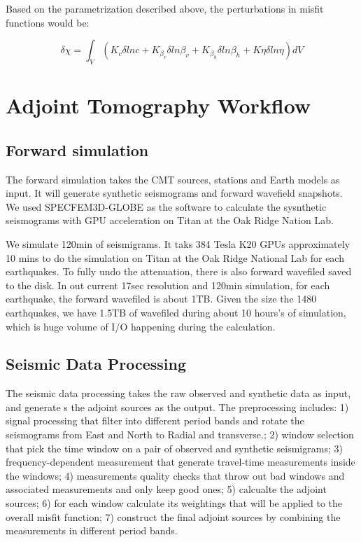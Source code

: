 \documentclass[extra,mreferee]{gji}
\begin{document}
Based on the parametrization described above, the perturbations in misfit functions would be:

\begin{equation*}
    \delta \chi = \int_V (K_c\delta lnc + K_{\beta_v}\delta ln\beta_v + K_{\beta_h}\delta ln\beta_h + K\eta \delta ln\eta) dV 
\end{equation*}

\section{Adjoint Tomography Workflow}

\subsection{Forward simulation}
The forward simulation takes the CMT sources, stations and Earth models as input. It will generate synthetic seismograms and forward wavefield snapshots. We used SPECFEM3D-GLOBE as the software to calculate the sysnthetic seismograms with GPU acceleration on Titan at the Oak Ridge Nation Lab.

We simulate 120min of seismigrams. It taks 384 Tesla K20 GPUs approximately 10 mins to do the simulation on Titan at the Oak Ridge National Lab for each earthquakes. To fully undo the attenuation, there is also forward wavefiled saved to the disk. In out current 17sec resolution and 120min simulation, for each earthquake, the forward wavefiled is about 1TB. Given the size the 1480 earthquakes, we have 1.5TB of wavefiled during about 10 hours's of simulation, which is huge volume of I/O happening during the calculation.

\subsection{Seismic Data Processing}

The seismic data processing takes the raw observed and synthetic data as input, and generate s the adjoint sources as the output. The preprocessing includes: 1) signal processing that  filter into different period bands and rotate the seismograms from East and North to Radial and transverse.; 2) window selection that pick the time window on a pair of observed and synthetic seismigrams; 3) frequency-dependent measurement that generate travel-time measurements inside the windows; 4) measurements quality checks that throw out bad windows and associated measurements and only keep good ones; 5) calcualte the adjoint sources; 6) for each window calculate its weightings that will be applied to the overall misfit function; 7) construct the final adjoint sources by combining the measurements in different period bands.
\end{document}
